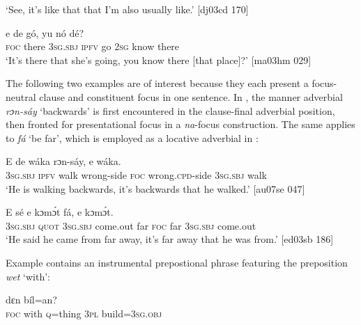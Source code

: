 \glt ‘See, it’s like that that I’m also usually like.’ [dj03cd 170]
\z


\ea%
    \label{ex:key:705}
    \gll {}      e    de  gó,  yu  nó    dé?\\
\textsc{foc}  there  \textsc{3sg.sbj}  \textsc{ipfv}  go  \textsc{2sg}  know  there\\

\glt ‘It’s there that she’s going, you know there [that place]?’ [ma03hm 029]
\z

The following two examples are of interest because they each present a focus-neutral clause and constituent focus in one sentence. In , the manner adverbial \textit{rɔn-sáy} ‘backwards’ is first encountered in the clause-final adverbial position, then fronted for presentational focus in a \textit{na}{}-focus construction. The same applies to \textit{fá} ‘be far’, which is employed as a locative adverbial in : 


\ea%
    \label{ex:key:706}
    \gll E    de  wáka  rɔn-sáy,       e    wáka.\\
\textsc{3sg.sbj}  \textsc{ipfv}  walk  wrong-side  \textsc{foc}  wrong.\textsc{cpd}{}-side  \textsc{3sg.sbj}  walk\\

\glt  ‘He is walking backwards, it’s backwards that he walked.’ [au07se 047]
\z


\ea%
    \label{ex:key:707}
    \gll E    sé    e    kɔmɔ́t    fá,     e    kɔmɔ́t.\\
\textsc{3sg.sbj}  \textsc{quot}    \textsc{3sg.sbj}  come.out  far  \textsc{foc}  far  \textsc{3sg.sbj}  come.out\\

\glt  ‘He said he came from far away, it’s far away that he was from.’ [ed03sb 186]
\z

Example  contains an instrumental prepostional phrase featuring the preposition \textit{wet} ‘with’:


\ea%
    \label{ex:key:708}
    \gll {}        dɛn  bíl=an?\\
\textsc{foc}  with    \textsc{q}=thing  \textsc{3pl}  build=\textsc{3sg.obj}\\

